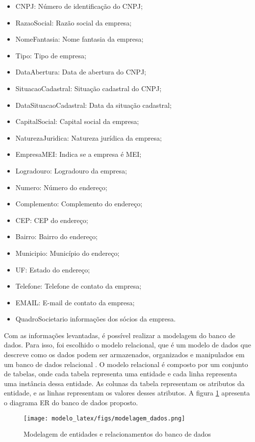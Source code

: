 \begin{itemize}
    \item CNPJ: Número de identificação do CNPJ;
    \item RazaoSocial: Razão social da empresa;
    \item NomeFantasia: Nome fantasia da empresa;
    \item Tipo: Tipo de empresa;
    \item DataAbertura: Data de abertura do CNPJ;
    \item SituacaoCadastral: Situação cadastral do CNPJ;
    \item DataSituacaoCadastral: Data da situação cadastral;
    \item CapitalSocial: Capital social da empresa;
    \item NaturezaJuridica: Natureza jurídica da empresa;
    \item EmpresaMEI: Indica se a empresa é MEI;
    \item Logradouro: Logradouro da empresa;
    \item Numero: Número do endereço;
    \item Complemento: Complemento do endereço;
    \item CEP: CEP do endereço;
    \item Bairro: Bairro do endereço;
    \item Municipio: Município do endereço;
    \item UF: Estado do endereço;
    \item Telefone: Telefone de contato da empresa;
    \item EMAIL: E-mail de contato da empresa;
    \item QuadroSocietario informações dos sócios da empresa.
\end{itemize}

Com as informações levantadas, é possível realizar a modelagem do banco de dados. Para isso, foi escolhido o modelo relacional, que é um modelo de dados que descreve como os dados podem ser armazenados, organizados e manipulados em um banco de dados relacional \cite{ramakrishnan2003database}. O modelo relacional é composto por um conjunto de tabelas, onde cada tabela representa uma entidade e cada linha representa uma instância dessa entidade. As colunas da tabela representam os atributos da entidade, e as linhas representam os valores desses atributos. A figura \ref{fig:diagrama_er} apresenta o diagrama ER do banco de dados proposto.

\begin{figure}[H]
    \centering
    \texttt{[image: modelo\_latex/figs/modelagem\_dados.png]}
    \caption{Modelagem de entidades e relacionamentos do banco de dados}
    \label{fig:diagrama_er}
\end{figure}


